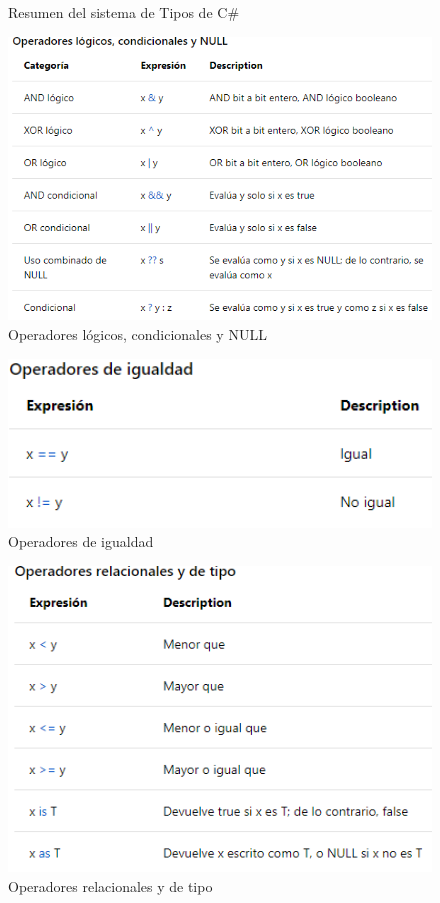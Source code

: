 \documentclass[12pt,a4paper]{report}
\begin{document}
{\begin{figure}[hbtp]
\caption{Resumen del sistema de Tipos de C\#}
\end{figure}
\begin{figure}[hbtp]
\centering
\includegraphics[width=16cm]{Csh_Imagenes/op_condicionales.png}
\caption{Operadores lógicos, condicionales y NULL}
\end{figure}
\begin{figure}[hbtp]
\centering
\includegraphics[width=16cm]{Csh_Imagenes/op_igualdad.png}
\caption{Operadores de igualdad}
\end{figure}
\begin{figure}[hbtp]
\centering
\includegraphics[width=16cm]{Csh_Imagenes/op_relacionales.png}
\caption{Operadores relacionales y de tipo}
\end{figure}

}
\end{document}
